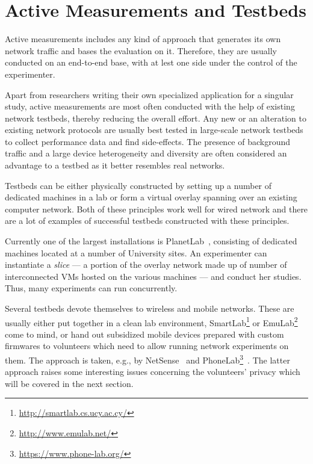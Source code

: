 \section{Active Measurements and Testbeds}
\label{c6:sec:active-measurements}

Active measurements includes any kind of approach that generates its own network traffic and bases the evaluation on it. Therefore, they are usually conducted on an end-to-end base, with at lest one side under the control of the experimenter.

Apart from researchers writing their own specialized application for a singular study, active measurements are most often conducted with the help of existing network testbeds, thereby reducing the overall effort.
Any new or an alteration to existing network protocols are usually best tested in large-scale network testbeds to collect performance data and find side-effects. The presence of background traffic and a large device heterogeneity and diversity are often considered an advantage to a testbed as it better resembles real networks.

Testbeds can be either physically constructed by setting up a number of dedicated machines in a lab or form a virtual overlay spanning over an existing computer network. Both of these principles work well for wired network and there are a lot of examples of successful testbeds constructed with these principles.

Currently one of the largest installations is PlanetLab~\cite{chun2003planetlab}, consisting of dedicated machines located at a number of University sites. An experimenter can instantiate a \textit{slice} --- a portion of the overlay network made up of number of interconnected \glspl{VM} hosted on the various machines --- and conduct her studies. Thus, many experiments can run concurrently.

Several testbeds devote themselves to wireless and mobile networks. These are usually either put together in a clean lab environment, SmartLab\footnote{\url{http://smartlab.cs.ucy.ac.cy/}} or 
EmuLab\footnote{\url{http://www.emulab.net/}} come to mind, or hand out subsidized mobile devices prepared with custom firmwares to volunteers which need to allow running network experiments on them. The approach is taken, e.g., by NetSense~\cite{Striegel:2013:LLN:2491159.2491171} and PhoneLab\footnote{\url{https://www.phone-lab.org/}}~\cite{Nandugudi:2013:PLP:2536714.2536718}. The latter approach raises some interesting issues concerning the volunteers' privacy which will be covered in the next section.

